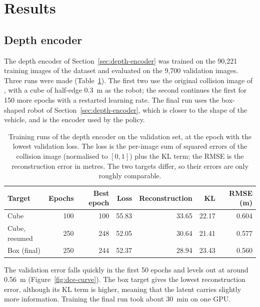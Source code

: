\section{Results}
\label{sec:results}

\subsection{Depth encoder}
\label{sec:results-encoder}
The depth encoder of Section~\ref{sec:depth-encoder} was trained on the 90,221 training images of the dataset and evaluated on the 9,700 validation images. Three runs were made (Table~\ref{tab:dce-results}). The first two use the original collision image of \textcite{kulkarni2023task}, with a cube of half-edge \SI{0.3}{\metre} as the robot; the second continues the first for 150 more epochs with a restarted learning rate. The final run uses the box-shaped robot of Section~\ref{sec:depth-encoder}, which is closer to the shape of the vehicle, and is the encoder used by the policy.

\begin{table}[ht]
\centering
\caption{Training runs of the depth encoder on the validation set, at the epoch with the lowest validation loss. The loss is the per-image sum of squared errors of the collision image (normalised to $[0,1]$) plus the KL term; the RMSE is the reconstruction error in metres. The two targets differ, so their errors are only roughly comparable.}
\label{tab:dce-results}
\begin{tabular}{@{}lrrrrrr@{}}
\toprule
Target & Epochs & Best epoch & Loss & Reconstruction & KL & RMSE (\si{\metre}) \\
\midrule
Cube                & 100 & 100 & 55.83 & 33.65 & 22.17 & 0.604 \\
Cube, resumed       & 250 & 248 & 52.05 & 30.64 & 21.41 & 0.577 \\
Box (final)         & 250 & 244 & 52.37 & 28.94 & 23.43 & 0.560 \\
\bottomrule
\end{tabular}
\end{table}

The validation error falls quickly in the first 50 epochs and levels out at around \SI{0.56}{\metre} (Figure~\ref{fig:dce-curve}). The box target gives the lowest reconstruction error, although its KL term is higher, meaning that the latent carries slightly more information. Training the final run took about \SI{30}{\minute} on one GPU.

